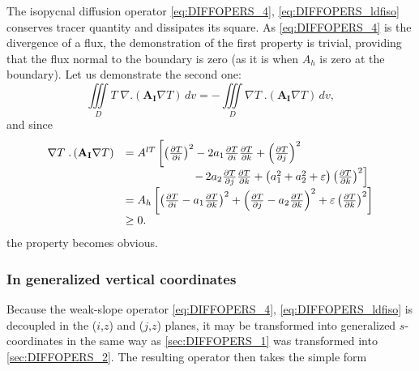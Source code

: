 \documentclass[../main/NEMO_manual]{subfiles}
\begin{document}
The isopycnal diffusion operator \autoref{eq:DIFFOPERS_4},
\autoref{eq:DIFFOPERS_ldfiso} conserves tracer quantity and dissipates its square.
As \autoref{eq:DIFFOPERS_4} is the divergence of a flux, the demonstration of the first property is trivial, providing that the flux normal to the boundary is zero
(as it is when $A_h$ is zero at the boundary). Let us demonstrate the second one:
\[
  \iiint\limits_D T\;\nabla .\left( {\textbf{A}}_{\textbf{I}} \nabla T \right)\,dv
  = -\iiint\limits_D \nabla T\;.\left( {\textbf{A}}_{\textbf{I}} \nabla T \right)\,dv,
\]
and since
\begin{align*}
  {
  \begin{array}{*{20}l}
    \nabla T\;.\left( {{\mathrm {\mathbf A}}_{\mathrm {\mathbf I}} \nabla T}
    \right)&=A^{lT}\left[ {\left( {\frac{\partial T}{\partial i}} \right)^2-2a_1
             \frac{\partial T}{\partial i}\frac{\partial T}{\partial k}+\left(
             {\frac{\partial T}{\partial j}} \right)^2} \right. \\
           &\qquad \qquad \qquad
             { \left. -\,{2a_2 \frac{\partial T}{\partial j}\frac{\partial T}{\partial k}+\left( {a_1 ^2+a_2 ^2+\varepsilon} \right)\left( {\frac{\partial T}{\partial k}} \right)^2} \right]} \\
           &=A_h \left[ {\left( {\frac{\partial T}{\partial i}-a_1 \frac{\partial
             T}{\partial k}} \right)^2+\left( {\frac{\partial T}{\partial
             j}-a_2 \frac{\partial T}{\partial k}} \right)^2}
             +\varepsilon \left(\frac{\partial T}{\partial k}\right) ^2\right]      \\
           & \geq 0 .
  \end{array}
             }
\end{align*}
the property becomes obvious.

\subsubsection*{In generalized vertical coordinates}

Because the weak-slope operator \autoref{eq:DIFFOPERS_4},
\autoref{eq:DIFFOPERS_ldfiso} is decoupled in the ($i$,$z$) and ($j$,$z$) planes,
it may be transformed into generalized $s$-coordinates in the same way as
\autoref{sec:DIFFOPERS_1} was transformed into \autoref{sec:DIFFOPERS_2}.
The resulting operator then takes the simple form
\end{document}
